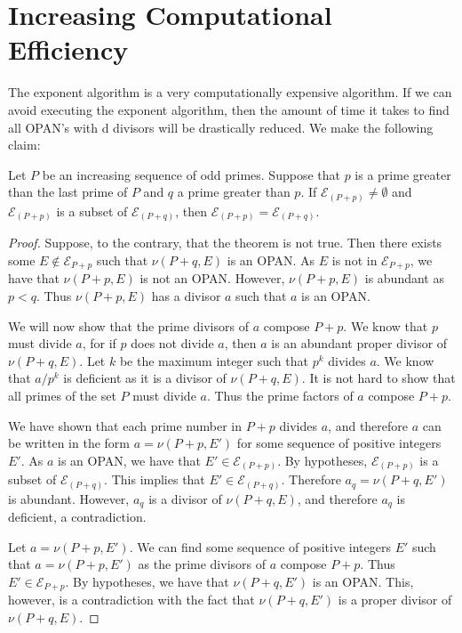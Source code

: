\documentclass[../paper.tex]{subfiles}
\begin{document}
\section{Increasing Computational Efficiency}

The exponent algorithm is a very computationally expensive
algorithm. If we can avoid executing the exponent algorithm, then
the amount of time it takes to find all OPAN's with d divisors will
be drastically reduced. 
We make the following claim:

\begin{lem}\label{first}
Let $P$ be an increasing sequence of odd primes. Suppose
that $p$ is a prime greater than the last prime of $P$ and $q$ a
prime greater than $p$. If $\mathcal{E}_{(P + p)} \neq 
\emptyset$ and $\mathcal{E}_{(P + p)}$ is a subset of 
$\mathcal{E}_{(P + q)}$, then $\mathcal{E}_{(P + p)} = 
\mathcal{E}_{(P + q)}$.
\end{lem}

\begin{proof}
  Suppose, to the contrary, that the theorem is not true. Then
there exists some $E \notin \mathcal{E}_{P + p}$ such that $\nu
(P + q, E)$ is an OPAN. As $E$ is not in $\mathcal{E}_{P + p}$,
we have that $\nu (P + p, E)$ is not an OPAN. However, $\nu (P +
p, E)$ is abundant as $p < q$. Thus $\nu (P + p, E)$ has a
divisor $a$ such that $a$ is an OPAN. 

  We will now show that the prime divisors of $a$ compose $P + p$.
We know that $p$ must divide $a$, for if $p$ does not divide $a$,
then $a$ is an abundant proper divisor of $\nu (P + q, E)$. 
Let $k$ be the maximum
integer such that $p^k$ divides $a$. We know that $a / p^k$ is
deficient as it is a divisor of $\nu (P + q, E)$. It is not hard
to show that all primes of the set $P$ must divide $a$. Thus the
prime factors of $a$ compose $P + p$. 

  We have shown that each prime number in $P + p$ divides $a$, and
therefore $a$ can be written in the form $a = \nu(P + p, E')$ for
some sequence of positive integers $E'$. As $a$ is an OPAN, we
have that $E' \in \mathcal{E}_{(P +p)}$. By hypotheses,
$\mathcal{E}_{(P + p)}$ is a subset of $\mathcal{E}_{(P + q)}$.
This implies that $E' \in \mathcal{E}_{(P + q)}$. Therefore $a_q = 
\nu(P + q, E')$ is abundant. However, $a_q$ is a divisor of
$\nu (P + q, E)$, and therefore $a_q$ is deficient, a
contradiction.


  Let $a = \nu(P + p, E')$. We can find some sequence of positive
integers $E'$ such that $a = \nu (P + p, E')$ as the prime divisors
of $a$ compose $P + p$. Thus $E' \in \mathcal{E}_{P + p}$. By
hypotheses, we have that $\nu(P + q, E')$ is an OPAN. This,
however, is a contradiction with the fact that $\nu(P + q, E')$
is a proper divisor of $\nu(P + q, E)$.
\end{proof}
\end{document}
